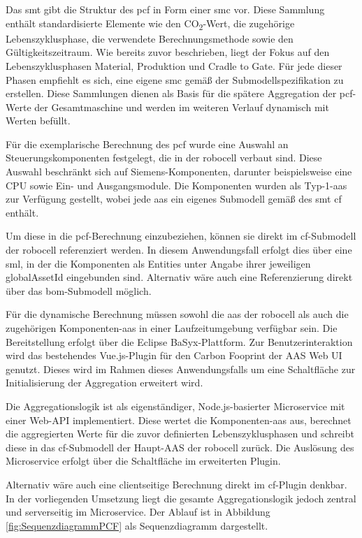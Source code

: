 Das \acs{smt} gibt die Struktur des \acs{pcf} in Form einer \acs{smc} vor.  
Diese Sammlung enthält standardisierte Elemente wie den CO\textsubscript{2}-Wert, die zugehörige Lebenszyklusphase, die verwendete Berechnungsmethode sowie den Gültigkeitszeitraum.
Wie bereits zuvor beschrieben, liegt der Fokus auf den Lebenszyklusphasen Material, Produktion und Cradle to Gate.  
Für jede dieser Phasen empfiehlt es sich, eine eigene \acs{smc} gemäß der Submodellspezifikation zu erstellen.  
Diese Sammlungen dienen als Basis für die spätere Aggregation der \acs{pcf}-Werte der Gesamtmaschine und werden im weiteren Verlauf dynamisch mit Werten befüllt.

Für die exemplarische Berechnung des \acs{pcf} wurde eine Auswahl an Steuerungskomponenten festgelegt, die in der robocell verbaut sind.  
Diese Auswahl beschränkt sich auf Siemens-Komponenten, darunter beispielsweise eine CPU sowie Ein- und Ausgangsmodule.  
Die Komponenten wurden als Typ-1-\acs{aas} zur Verfügung gestellt, wobei jede \acs{aas} ein eigenes Submodell gemäß des \acs{smt} \acs{cf} enthält.

Um diese in die \acs{pcf}-Berechnung einzubeziehen, können sie direkt im \acs{cf}-Submodell der robocell referenziert werden. 
In diesem Anwendungsfall erfolgt dies über eine \acs{sml}, in der die Komponenten als Entities unter Angabe ihrer jeweiligen globalAssetId eingebunden sind. 
Alternativ wäre auch eine Referenzierung direkt über das \acs{bom}-Submodell möglich.

Für die dynamische Berechnung müssen sowohl die \acs{aas} der robocell als auch die zugehörigen Komponenten-\acs{aas} in einer Laufzeitumgebung verfügbar sein. 
Die Bereitstellung erfolgt über die Eclipse BaSyx-Plattform.
Zur Benutzerinteraktion wird das bestehendes Vue.js-Plugin für den Carbon Fooprint der AAS Web UI genutzt.
Dieses wird im Rahmen dieses Anwendungsfalls um eine Schaltfläche zur Initialisierung der Aggregation erweitert wird.

Die Aggregationslogik ist als eigenständiger, Node.js-basierter Microservice mit einer Web-API implementiert. 
Diese wertet die Komponenten-\acs{aas} aus, berechnet die aggregierten Werte für die zuvor definierten Lebenszyklusphasen und schreibt diese in das \acs{cf}-Submodell der Haupt-AAS der robocell zurück. 
Die Auslösung des Microservice erfolgt über die Schaltfläche im erweiterten Plugin.

Alternativ wäre auch eine clientseitige Berechnung direkt im \acs{cf}-Plugin denkbar. 
In der vorliegenden Umsetzung liegt die gesamte Aggregationslogik jedoch zentral und serverseitig im Microservice. 
Der Ablauf ist in Abbildung \ref{fig:SequenzdiagrammPCF} als Sequenzdiagramm dargestellt.

